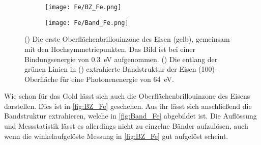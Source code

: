         \begin{figure}
            \begin{subfigure}[t]{0.34\textwidth}
                \centering
                \texttt{[image: Fe/BZ\_Fe.png]}
                \subcaption{}
                \label{fig:BZ_Fe}
            \end{subfigure}
            \begin{subfigure}[t]{0.62\textwidth}
                \centering
                \texttt{[image: Fe/Band\_Fe.png]}
                \subcaption{}
                \label{fig:Band_Fe}
            \end{subfigure}
            \caption{() Die erste Oberflächenbrillouinzone des Eisen (gelb), gemeinsam mit den Hochsymmetriepunkten. Das Bild ist bei einer Bindungsenergie von \SI{0.3}{\electronvolt} aufgenommen.
            () Die entlang der grünen Linien in () extrahierte Bandstruktur der Eisen (100)-Oberfläche für eine Photonenenergie von \SI{64}{\electronvolt}.}
        \end{figure}
        Wie schon für das Gold lässt sich auch die Oberflächenbrillouinzone des Eisens darstellen. 
        Dies ist in \autoref{fig:BZ_Fe} geschehen.
        Aus ihr lässt sich anschließend die Bandstruktur extrahieren, welche in \autoref{fig:Band_Fe} abgebildet ist.
        Die Auflössung und Messstatistik lässt es allerdings nicht zu einzelne Bänder aufzulösen, auch wenn die winkelaufgelöste Messung in \autoref{fig:BZ_Fe} gut aufgelöst scheint. 

